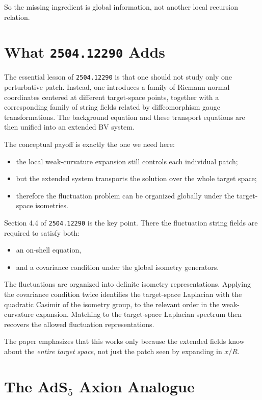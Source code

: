 \documentclass[12pt]{article}
\begin{document}
So the missing ingredient is global information, not another local recursion relation.

\section{What \texttt{2504.12290} Adds}

The essential lesson of \texttt{2504.12290} is that one should not study only one perturbative patch.
Instead, one introduces a family of Riemann normal coordinates centered at different target-space points,
together with a corresponding family of string fields related by diffeomorphism gauge transformations.
The background equation and these transport equations are then unified into an extended BV system.

The conceptual payoff is exactly the one we need here:
\begin{itemize}
\item the local weak-curvature expansion still controls each individual patch;
\item but the extended system transports the solution over the whole target space;
\item therefore the fluctuation problem can be organized globally under the target-space isometries.
\end{itemize}

Section 4.4 of \texttt{2504.12290} is the key point.  There the fluctuation string fields are required
to satisfy both:
\begin{itemize}
\item an on-shell equation,
\item and a covariance condition under the global isometry generators.
\end{itemize}
The fluctuations are organized into definite isometry representations.  Applying the covariance condition
twice identifies the target-space Laplacian with the quadratic Casimir of the isometry group, to the
relevant order in the weak-curvature expansion.  Matching to the target-space Laplacian spectrum then
recovers the allowed fluctuation representations.

The paper emphasizes that this works only because the extended fields know about the \emph{entire target
space}, not just the patch seen by expanding in $x/R$.

\section{\texorpdfstring{The AdS$_5$ Axion Analogue}{The AdS5 Axion Analogue}}
\end{document}
